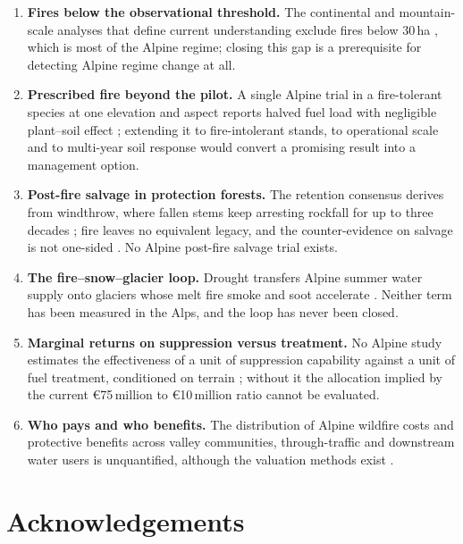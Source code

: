 \documentclass[11pt,a4paper]{article}
\begin{document}
\begin{enumerate}
    \item \textbf{Fires below the observational threshold.} The continental and mountain-scale analyses that define current understanding exclude fires below 30\,ha \citep{beloiu_climatedriven_2026}, which is most of the Alpine regime; closing this gap is a prerequisite for detecting Alpine regime change at all.
    \item \textbf{Prescribed fire beyond the pilot.} A single Alpine trial in a fire-tolerant species at one elevation and aspect reports halved fuel load with negligible plant--soil effect \citep{gamba_prescribed_2025}; extending it to fire-intolerant stands, to operational scale and to multi-year soil response would convert a promising result into a management option.
    \item \textbf{Post-fire salvage in protection forests.} The retention consensus derives from windthrow, where fallen stems keep arresting rockfall for up to three decades \citep{costa_biological_2021}; fire leaves no equivalent legacy, and the counter-evidence on salvage is not one-sided \citep{seben_impact_2024}. No Alpine post-fire salvage trial exists.
    \item \textbf{The fire--snow--glacier loop.} Drought transfers Alpine summer water supply onto glaciers \citep{leone_20222023_2026} whose melt fire smoke and soot accelerate \citep{aubrywake_fire_2022, koshkin_wildfire_2022}. Neither term has been measured in the Alps, and the loop has never been closed.
    \item \textbf{Marginal returns on suppression versus treatment.} No Alpine study estimates the effectiveness of a unit of suppression capability against a unit of fuel treatment, conditioned on terrain \citep{cardil_assessing_2025, brodie_forest_2024}; without it the allocation implied by the current €75\,million to €10\,million ratio \citep{muller_forest_2020} cannot be evaluated.
    \item \textbf{Who pays and who benefits.} The distribution of Alpine wildfire costs and protective benefits across valley communities, through-traffic and downstream water users is unquantified, although the valuation methods exist \citep{accastello_asforesee_2019, moos_climate_2021}.
\end{enumerate}


\section*{Acknowledgements}
\end{document}
